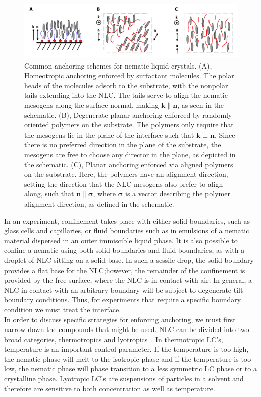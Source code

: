\begin{figure}[h]
  \centering
  \includegraphics{figures/C2/Ch2-Figs_Anchor.png}
  \caption{Common anchoring schemes for nematic liquid crystals. (A), Homeotropic anchoring enforced by surfactant molecules.
  The polar heads of the molecules adsorb to the substrate, with the nonpolar tails extending into the NLC.
  The tails serve to align the nematic mesogens along the surface normal, making $\mathbf{k} \parallel \mathbf{n}$, as seen in the schematic.
  (B), Degenerate planar anchoring enforced by randomly oriented polymers on the substrate. The polymers only require that the mesogens lie in the plane of the interface such that $\mathbf{k} \perp \mathbf{n}$. Since there is no preferred direction in the plane of the substrate, the mesogens are free to choose any director in the plane, as depicted in the schematic.
  (C), Planar anchoring enforced via aligned polymers on the substrate. Here, the polymers have an alignment direction, setting the direction that the NLC mesogens also prefer to align along, such that $\mathbf{n} \parallel \bm{\sigma}$, where $\bm{\sigma}$ is a vector describing the polymer alignment direction, as defined in the schematic.}\label{f:2-Anchor}
\end{figure}

In an experiment, confinement takes place with either solid boundaries, such as glass cells and capillaries, or fluid boundaries such as in emulsions of a nematic material dispersed in an outer immiscible liquid phase.
It is also possible to confine a nematic using both solid boundaries and fluid boundaries, as with a droplet of NLC sitting on a solid base.
In such a sessile drop, the solid boundary provides a flat base for the NLC;\@ however, the remainder of the confinement is provided by the free surface, where the NLC is in contact with air.
In general, a NLC in contact with an arbitrary boundary will be subject to degenerate tilt boundary conditions.
Thus, for experiments that require a specific boundary condition we must treat the interface.\\

In order to discuss specific strategies for enforcing anchoring, we must first narrow down the compounds that might be used.
NLC can be divided into two broad categories, thermotropics and lyotropics~\cite{RN33}.
In thermotropic LC's, temperature is an important control parameter.
If the temperature is too high, the nematic phase will melt to the isotropic phase and if the temperature is too low, the nematic phase will phase transition to a less symmetric LC phase or to a crystalline phase.
Lyotropic LC's are suspensions of particles in a solvent and therefore are sensitive to both concentration as well as temperature.

